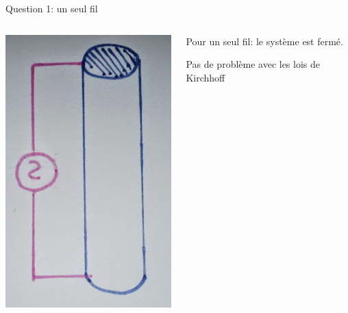 \documentclass{beamer}
\begin{document}
\begin{frame}{Question 1: un seul fil}
%
%        	
	\begin{columns}
		\begin{column}{0.40\textwidth}
			\begin{center}
	    		\includegraphics[scale=0.2, angle=90]{Question1-2.png}
        		\end{center}
        	\end{column}
        	\begin{column}{0.40\textwidth}
			\begin{center}
	    Pour un seul fil: le système est fermé.
	    
	    Pas de problème avec les lois de Kirchhoff 
        	\end{center}
        	\end{column}
        	\end{columns}
\end{frame}
\end{document}
